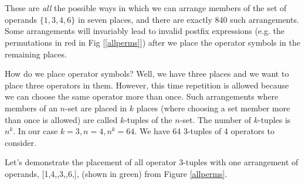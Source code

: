 \documentclass{resonance}
\newenvironment{arrangement}{\captionsetup{type=mytype}}{}
\begin{document}
\begin{arrangement}
\\
\\
\label{allperms}
\end{arrangement}

These are \emph{all} the possible ways in which we can arrange members of the set of operands $\{1,3, 4, 6\}$ in seven places, and there are exactly 840 such arrangements. Some arrangements will invariably lead to invalid postfix expressions (e.g. the permutations in red in Fig [\ref{allperms}]) after we place the operator symbols in the remaining places. 

How do we place operator symbols? Well, we have three places and we want to place three operators in them. However, this time repetition is allowed because we can choose the same operator more than once. Such arrangements where members of an $n$-set are placed in $k$ places (where choosing a set member more than once is allowed) are called $k$-tuples \cite{ktuples} of the $n$-set. The number of $k$-tuples is $n^{k}$. In our case $k=3, n=4, n^k=64$. We have 64 3-tuples of 4 operators to consider.

Let's demonstrate the placement of all operator 3-tuples with one arrangement of operands, $[$1,4,\textvisiblespace,3,\textvisiblespace,6,\textvisiblespace$]$, (shown in green) from Figure \ref{allperms}.
\end{document}

